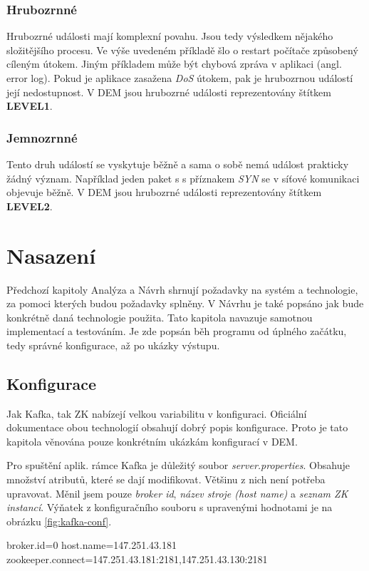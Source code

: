 \documentclass[
  digital, %
  table,   %
  nolof,     %
  nolot,     %
  oneside, %
  nocover,
  monochrome,
  12pt
]{fithesis3}
\begin{document}
\subsection*{Hrubozrnné}
Hrubozrné události mají komplexní povahu. Jsou tedy výsledkem nějakého složitějšího procesu. Ve výše uvedeném příkladě šlo o restart počítače způsobený cíleným útokem. Jiným příkladem může být chybová zpráva v aplikaci (angl. error log). Pokud je aplikace zasažena \textit{DoS} útokem, pak je hrubozrnou událostí její nedostupnost. V DEM jsou hrubozrné události reprezentovány štítkem \textbf{LEVEL1}.
 
\subsection*{Jemnozrnné}
Tento druh událostí se vyskytuje běžně a sama o sobě nemá událost prakticky žádný význam. Například jeden paket s s příznakem \textit{SYN} se v síťové komunikaci objevuje běžně. V DEM jsou hrubozrné události reprezentovány štítkem \textbf{LEVEL2}.

\chapter{Nasazení}
Předchozí kapitoly Analýza a Návrh shrnují požadavky na systém a technologie, za pomoci kterých budou požadavky splněny. V Návrhu je také popsáno jak bude konkrétně daná technologie použita. Tato kapitola navazuje samotnou implementací a testováním. Je zde popsán běh programu od úplného začátku, tedy správné konfigurace, až po ukázky výstupu. 

\section{Konfigurace}
Jak Kafka, tak ZK nabízejí velkou variabilitu v konfiguraci. Oficiální dokumentace obou technologií obsahují dobrý popis konfigurace. Proto je tato kapitola věnována pouze konkrétním ukázkám konfigurací v DEM.

Pro spuštění aplik. rámce Kafka je důležitý soubor \textit{server.properties}. Obsahuje množství atributů, které se dají modifikovat. Většinu z nich není potřeba upravovat. Měnil jsem pouze \textit{broker id}, \textit{název stroje (host name)} a \textit{seznam ZK instancí}. Výňatek z konfiguračního souboru s upravenými hodnotami je na obrázku \ref{fig:kafka-conf}.

\begin{center}
\begin{minipage}[H]{\linewidth}
	\begin{mylisting}
broker.id=0
host.name=147.251.43.181
zookeeper.connect=147.251.43.181:2181,147.251.43.130:2181
	\end{mylisting}
	\label{fig:kafka-conf} 
\end{minipage}
\end{center}
\end{document}

